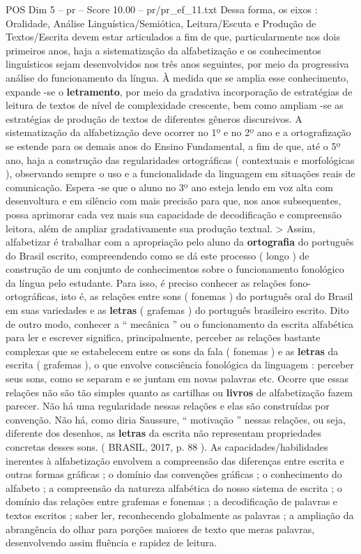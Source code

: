 \begin{textsample}{POS Dim 5 – pr – Score 10.00 – pr/pr\_ef\_11.txt}
Dessa forma, os eixos : Oralidade, Análise Linguística/Semiótica, Leitura/Escuta e Produção de Textos/Escrita devem estar articulados a fim de que, particularmente nos dois primeiros anos, haja a sistematização da alfabetização e os conhecimentos linguísticos sejam desenvolvidos nos três anos seguintes, por meio da progressiva análise do funcionamento da língua.
À medida que se amplia esse conhecimento, expande -se o \textbf{letramento}, por meio da gradativa incorporação de estratégias de leitura de textos de nível de complexidade crescente, bem como ampliam -se as estratégias de produção de textos de diferentes gêneros discursivos.
A sistematização da alfabetização deve ocorrer no 1º e no 2º ano e a ortografização se estende para os demais anos do Ensino Fundamental, a fim de que, até o 5º ano, haja a construção das regularidades ortográficas ( contextuais e morfológicas ), observando sempre o uso e a funcionalidade da linguagem em situações reais de comunicação.
Espera -se que o aluno no 3º ano esteja lendo em voz alta com desenvoltura e em silêncio com mais precisão para que, nos anos subsequentes, possa aprimorar cada vez mais sua capacidade de decodificação e compreensão leitora, além de ampliar gradativamente sua produção textual. > Assim, alfabetizar é trabalhar com a apropriação pelo aluno da \textbf{ortografia} do português do Brasil escrito, compreendendo como se dá este processo ( longo ) de construção de um conjunto de conhecimentos sobre o funcionamento fonológico da língua pelo estudante.
Para isso, é preciso conhecer as relações fono-ortográficas, isto é, as relações entre sons ( fonemas ) do português oral do Brasil em suas variedades e as \textbf{letras} ( grafemas ) do português brasileiro escrito.
Dito de outro modo, conhecer a “ mecânica ” ou o funcionamento da escrita alfabética para ler e escrever significa, principalmente, perceber as relações bastante complexas que se estabelecem entre os sons da fala ( fonemas ) e as \textbf{letras} da escrita ( grafemas ), o que envolve consciência fonológica da linguagem : perceber seus sons, como se separam e se juntam em novas palavras etc.
Ocorre que essas relações não são tão simples quanto as cartilhas ou \textbf{livros} de alfabetização fazem parecer.
Não há uma regularidade nessas relações e elas são construídas por convenção.
Não há, como diria Saussure, “ motivação ” nessas relações, ou seja, diferente dos desenhos, as \textbf{letras} da escrita não representam propriedades concretas desses sons. ( BRASIL, 2017, p. 88 ).
As capacidades/habilidades inerentes à alfabetização envolvem a compreensão das diferenças entre escrita e outras formas gráficas ; o domínio das convenções gráficas ; o conhecimento do alfabeto ; a compreensão da natureza alfabética do nosso sistema de escrita ; o domínio das relações entre grafemas e fonemas ; a decodificação de palavras e textos escritos ; saber ler, reconhecendo globalmente as palavras ; a ampliação da abrangência do olhar para porções maiores de texto que meras palavras, desenvolvendo assim fluência e rapidez de leitura.

\end{textsample}
